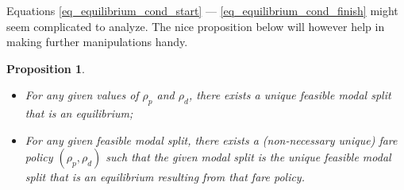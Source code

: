 \documentclass[english, a4paper]{article}
\theoremstyle{plain}
\newtheorem{prop}{Proposition}
\theoremstyle{definition}
\theoremstyle{remark}
\begin{document}
Equations \ref{eq_equilibrium_cond_start} --- \ref{eq_equilibrium_cond_finish} might seem complicated to analyze. The nice proposition below will however help in making further manipulations handy.

\begin{prop}
    \begin{itemize}
        \item For any given values of $\rho _p$ and $\rho _d$, there exists a unique feasible modal split that is an equilibrium;
        \item For any given feasible modal split, there exists a (non-necessary unique) fare policy $(\rho _p, \rho _d)$ such that the given modal split is the unique feasible modal split that is an equilibrium resulting from that fare policy.
    \end{itemize}
\end{prop}
\end{document}

